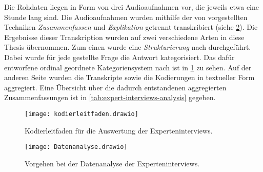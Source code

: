 Die Rohdaten liegen in Form von drei Audioaufnahmen vor, die jeweils etwa eine Stunde lang sind.
Die Audioaufnahmen wurden mithilfe der von  vorgestellten Techniken  \emph{Zusammenfassen} und \emph{Explikation} getrennt transkribiert (siehe \cref{fig:datenanalyse}).
Die Ergebnisse dieser Transkription wurden auf zwei verschiedene Arten in diese Thesis übernommen.
Zum einen wurde eine \emph{Strukturierung} nach  durchgeführt.
Dabei wurde für jede gestellte Frage die Antwort kategorisiert.
Das dafür entworfene \glqq ordinal geordnete Kategoriensystem\grqq{} nach  ist in \cref{fig:kodierleitfaden} zu sehen.
Auf der anderen Seite wurden die Transkripte sowie die Kodierungen in textueller Form aggregiert.
Eine Übersicht über die dadurch entstandenen aggregierten Zusammenfassungen ist in \cref{tab:expert-interviews-analysis} gegeben.

\begin{figure}[!ht]
	\centering
	\texttt{[image: kodierleitfaden.drawio]}
	\caption[Kodierleitfaden Auswertung Experteninterviews]{
		Kodierleitfaden für die Auswertung der Experteninterviews.
	}
	\label{fig:kodierleitfaden}
\end{figure}

\begin{figure}[!h]
	\centering
	\texttt{[image: Datenanalyse.drawio]}
	\caption[Vorgehen Datenanalyse Experteninterviews]{
		Vorgehen bei der Datenanalyse der Experteninterviews.
	}
	\label{fig:datenanalyse}
\end{figure}






